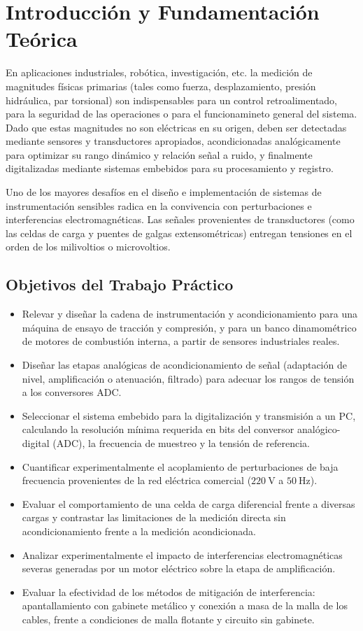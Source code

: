 \chapter{Introducción y Fundamentación Teórica}

En aplicaciones industriales, robótica, investigación, etc. la medición de
magnitudes físicas primarias (tales como fuerza, desplazamiento, presión
hidráulica, par torsional) son indispensables para un control retroalimentado, para la seguridad de las operaciones o para
el funcionamineto general del sistema. Dado que estas magnitudes no son eléctricas
en su origen, deben ser detectadas mediante sensores y transductores apropiados, acondicionadas
analógicamente para optimizar su rango dinámico y relación señal a ruido, y finalmente digitalizadas mediante sistemas
embebidos para su procesamiento y registro.

Uno de los mayores desafíos en el diseño e implementación de sistemas de instrumentación sensibles radica en la
convivencia con perturbaciones e interferencias electromagnéticas. Las señales provenientes de transductores
(como las celdas de carga y puentes de galgas extensométricas) entregan tensiones en el orden de los
milivoltios o microvoltios.

\section{Objetivos del Trabajo Práctico}
\begin{itemize}
    \item Relevar y diseñar la cadena de instrumentación y acondicionamiento para una máquina de ensayo de
    tracción y compresión, y para un banco dinamométrico de motores de combustión interna, a partir de sensores
    industriales reales.
    \item Diseñar las etapas analógicas de acondicionamiento de señal (adaptación de nivel, amplificación o atenuación, filtrado)
    para adecuar los rangos de tensión a los conversores ADC.
    \item Seleccionar el sistema embebido para la digitalización y transmisión a un PC, calculando la resolución mínima
    requerida en bits del conversor analógico-digital (ADC), la frecuencia de muestreo y la tensión de referencia.
    \item Cuantificar experimentalmente el acoplamiento de perturbaciones de baja frecuencia provenientes de la red
    eléctrica comercial ($\qty{220}{\volt}$ a $\qty{50}{\hertz}$).
    \item Evaluar el comportamiento de una celda de carga diferencial frente a diversas cargas y contrastar
    las limitaciones de la medición directa sin acondicionamiento frente a la medición acondicionada.
    \item Analizar experimentalmente el impacto de interferencias electromagnéticas severas generadas por un motor
    eléctrico sobre la etapa de amplificación.
    \item Evaluar la efectividad de los métodos de mitigación de interferencia: apantallamiento con
    gabinete metálico y conexión a masa de la malla de los cables, frente a condiciones de
    malla flotante y circuito sin gabinete.
\end{itemize}

